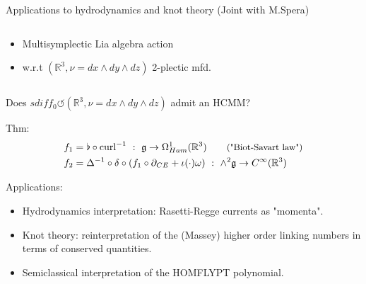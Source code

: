 \documentclass[handout,10pt]{beamer}
\begin{document}
\begin{frame}{Applications to hydrodynamics and knot theory (Joint with M.Spera)}
\begin{columns}
\begin{column}{.7\linewidth}
\begin{itemize}
				\item Multisymplectic Lia algebra action
				\item[] w.r.t $(\mathbb{R}^3,\nu = dx\wedge dy\wedge dz)$ 2-plectic mfd.
			\end{itemize}
		\end{column}
	\end{columns}
	\pause
	\vfill
	\begin{center}
		\alert{
		\faQuestionCircle \qquad
			{Does $sdiff_0 \circlearrowleft (\mathbb{R}^3,\nu = dx\wedge dy\wedge dz)$ admit an HCMM?}	
		\qquad \faQuestionCircle		
		}
	\end{center}
	\pause
{}
\begin{tcolorbox}[sidebyside,righthand width=.75\linewidth]
	Thm: \cite{Miti2018}
	\tcblower
	\vspace{-1.5em}
	\begin{align*}
	f_1 &= \flat \circ \text{curl}^{-1} ~:~ \mathfrak{g} \to \Omega^{1}_{Ham}(\mathbb{R}^3)
	\qquad \text{\small ("Biot-Savart law")}
	\\
	f_2 &= \Delta^{-1} \circ \delta \circ (f_1 \circ \partial_{CE} +\iota(\cdot)\omega) ~:~ \wedge^2\mathfrak{g} \to C^{\infty}(\mathbb{R}^3)
	\end{align*}
\end{tcolorbox}
	
	
	

	\pause
	\vfill
	Applications:
	\begin{itemize}[<+->]%
		\item[\CheckedBox]  Hydrodynamics interpretation: Rasetti-Regge currents as "momenta".
		\item[\CheckedBox]  Knot theory: reinterpretation of the (Massey) higher order linking numbers in terms of conserved quantities.
		\item[\CheckedBox]  Semiclassical interpretation of the HOMFLYPT polynomial.
	\end{itemize}

\end{frame}
\end{document}
